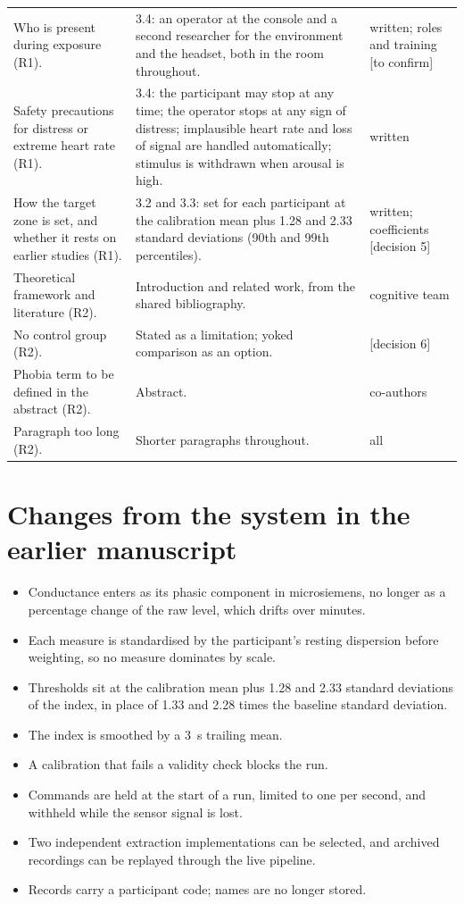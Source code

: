 \documentclass[11pt,a4paper]{article}
\newcommand{\ph}[1]{\textcolor{red!65!black}{[#1]}}
\begin{document}
\begin{longtable}{@{}L{5.6cm}L{7.4cm}L{2.6cm}@{}}
Who is present during exposure (R1). &
    3.4: an operator at the console and a second researcher for the
    environment and the headset, both in the room throughout. &
    written; roles and training \ph{to confirm} \\
Safety precautions for distress or extreme heart rate (R1). &
    3.4: the participant may stop at any time; the operator stops at any
    sign of distress; implausible heart rate and loss of signal are
    handled automatically; stimulus is withdrawn when arousal is high. &
    written \\
How the target zone is set, and whether it rests on earlier studies
(R1). &
    3.2 and 3.3: set for each participant at the calibration mean plus
    1.28 and 2.33 standard deviations (90th and 99th percentiles). &
    written; coefficients \ph{decision 5} \\
Theoretical framework and literature (R2). &
    Introduction and related work, from the shared bibliography. &
    cognitive team \\
No control group (R2). &
    Stated as a limitation; yoked comparison as an option. &
    \ph{decision 6} \\
Phobia term to be defined in the abstract (R2). &
    Abstract. &
    co-authors \\
Paragraph too long (R2). &
    Shorter paragraphs throughout. &
    all \\
\end{longtable}

\section{Changes from the system in the earlier manuscript}
\label{sec:changes}

\begin{itemize}
    \item Conductance enters as its phasic component in microsiemens,
    no longer as a percentage change of the raw level, which drifts
    over minutes.
    \item Each measure is standardised by the participant's resting
    dispersion before weighting, so no measure dominates by scale.
    \item Thresholds sit at the calibration mean plus 1.28 and 2.33
    standard deviations of the index, in place of 1.33 and 2.28 times
    the baseline standard deviation.
    \item The index is smoothed by a 3~s trailing mean.
    \item A calibration that fails a validity check blocks the run.
    \item Commands are held at the start of a run, limited to one per
    second, and withheld while the sensor signal is lost.
    \item Two independent extraction implementations can be selected,
    and archived recordings can be replayed through the live pipeline.
    \item Records carry a participant code; names are no longer stored.
\end{itemize}
\end{document}
